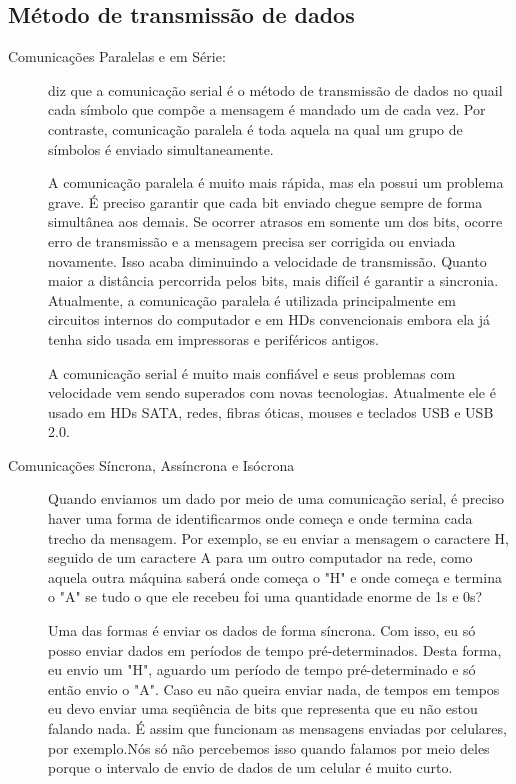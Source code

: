 	\subsection{Método de transmissão de dados}
	\begin{description}
		\item[Comunicações Paralelas e em Série:] \cite{castells2002sociedade} diz que a comunicação serial é o método de transmissão de dados no quail cada símbolo que compõe a mensagem é mandado um de cada vez. Por contraste, comunicação paralela é toda aquela na qual um grupo de símbolos é enviado simultaneamente.
		
		A comunicação paralela é muito mais rápida, mas ela possui um problema grave. É preciso garantir que cada bit enviado chegue sempre de forma simultânea aos demais. Se ocorrer atrasos em somente um dos bits, ocorre erro de transmissão e a mensagem precisa ser corrigida ou enviada novamente. Isso acaba diminuindo a velocidade de transmissão. Quanto maior a distância percorrida pelos bits, mais difícil é garantir a sincronia. Atualmente, a comunicação paralela é utilizada principalmente em circuitos internos do computador e em HDs convencionais embora ela já tenha sido usada em impressoras e periféricos antigos.
		
		A comunicação serial é muito mais confiável e seus problemas com velocidade vem sendo superados com novas tecnologias. Atualmente ele é usado em HDs SATA, redes, fibras óticas, mouses e teclados USB e USB 2.0.
		
		\item[Comunicações Síncrona, Assíncrona e Isócrona] Quando enviamos um dado por meio de uma comunicação serial, é preciso haver uma forma de identificarmos onde começa e onde termina cada trecho da mensagem. Por exemplo, se eu enviar a mensagem o caractere H, seguido de um caractere A para um outro computador na rede, como aquela outra máquina saberá onde começa o "H" e onde começa e termina o "A" se tudo o que ele recebeu foi uma quantidade enorme de 1s e 0s?
		
		Uma das formas é enviar os dados de forma síncrona. Com isso, eu só posso enviar dados em períodos de tempo pré-determinados. Desta forma, eu envio um "H", aguardo um período de tempo pré-determinado e só então envio o "A". Caso eu não queira enviar nada, de tempos em tempos eu devo enviar uma seqüência de bits que representa que eu não estou falando nada. É assim que funcionam as mensagens enviadas por celulares, por exemplo.Nós só não percebemos isso quando falamos por meio deles porque o intervalo de envio de dados de um celular é muito curto.
		

\end{description}

